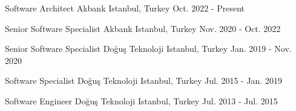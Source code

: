 

\begin{cventries}

  \cventry
    {Software Architect} %
    {Akbank} %
    {Istanbul, Turkey} %
    {Oct. 2022 - Present} %
    {}

  \cventry
    {Senior Software Specialist} %
    {Akbank} %
    {Istanbul, Turkey} %
    {Nov. 2020 - Oct. 2022} %
    {}

  \cventry
    {Senior Software Specialist} %
    {Doğuş Teknoloji} %
    {Istanbul, Turkey} %
    {Jan. 2019 - Nov. 2020} %
    {}

  \cventry
    {Software Specialist} %
    {Doğuş Teknoloji} %
    {Istanbul, Turkey} %
    {Jul. 2015 - Jan. 2019} %
    {}

  \cventry
    {Software Engineer} %
    {Doğuş Teknoloji} %
    {Istanbul, Turkey} %
    {Jul. 2013 - Jul. 2015} %
    {}

\end{cventries}
